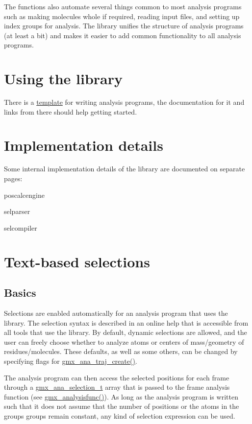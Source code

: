 \-The functions also automate several things common to most analysis programs such as making molecules whole if required, reading input files, and setting up index groups for analysis. \-The library unifies the structure of analysis programs (at least a bit) and makes it easier to add common functionality to all analysis programs.\hypertarget{libtrajana_main_using}{}\section{\-Using the library}\label{libtrajana_main_using}
\-There is a \hyperlink{template_8c}{template} for writing analysis programs, the documentation for it and links from there should help getting started.\hypertarget{libtrajana_libtrajana_impl}{}\section{\-Implementation details}\label{libtrajana_libtrajana_impl}
\-Some internal implementation details of the library are documented on separate pages\-:
\begin{DoxyItemize}
\item poscalcengine
\item selparser
\item selcompiler 
\end{DoxyItemize}\hypertarget{selengine}{}\section{\-Text-\/based selections}\label{selengine}
\hypertarget{selengine_selection_basics}{}\subsection{\-Basics}\label{selengine_selection_basics}
\-Selections are enabled automatically for an analysis program that uses the library. \-The selection syntax is described in an online help that is accessible from all tools that use the library. \-By default, dynamic selections are allowed, and the user can freely choose whether to analyze atoms or centers of mass/geometry of residues/molecules. \-These defaults, as well as some others, can be changed by specifying flags for \hyperlink{include_2trajana_8h_afc7e80051e814978605f1f690ec41c50}{gmx\-\_\-ana\-\_\-traj\-\_\-create()}.

\-The analysis program can then access the selected positions for each frame through a {\ttfamily \hyperlink{structgmx__ana__selection__t}{gmx\-\_\-ana\-\_\-selection\-\_\-t}} array that is passed to the frame analysis function (see \hyperlink{include_2trajana_8h_ae359015d9f5e49a31d5f4fd113bf7a3d}{gmx\-\_\-analysisfunc()}). \-As long as the analysis program is written such that it does not assume that the number of positions or the atoms in the groups groups remain constant, any kind of selection expression can be used.


